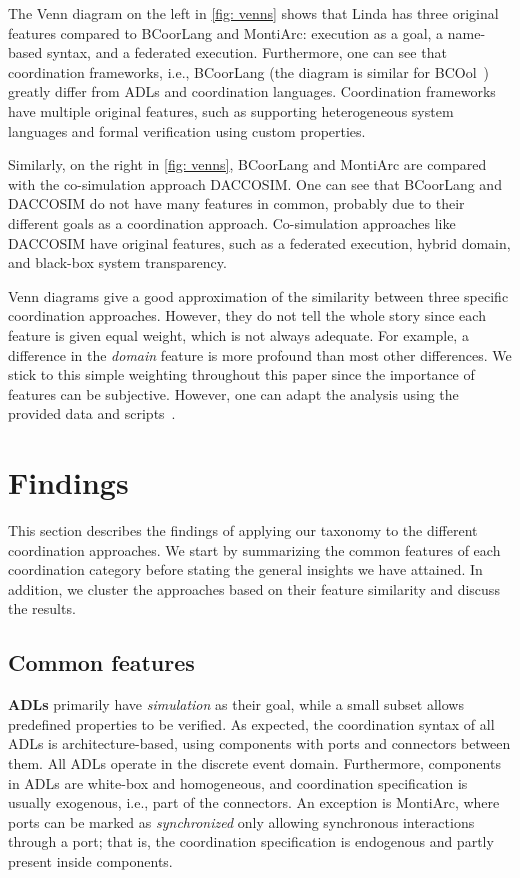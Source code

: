 \documentclass[runningheads]{llncs}
\begin{document}
The Venn diagram on the left in \autoref{fig: venns} shows that Linda has three original features compared to BCoorLang and MontiArc: execution as a goal, a name-based syntax, and a federated execution.
Furthermore, one can see that coordination frameworks, i.e., BCoorLang (the diagram is similar for BCOol~\cite{varalarsenBehavioralCoordinationOperator2015,varalarsenBCOolBehavioralCoordination2016}) greatly differ from ADLs and coordination languages.
Coordination frameworks have multiple original features, such as supporting heterogeneous system languages and formal verification using custom properties.

Similarly, on the right in \autoref{fig: venns}, BCoorLang and MontiArc are compared with the co-simulation approach DACCOSIM.
One can see that BCoorLang and DACCOSIM do not have many features in common, probably due to their different goals as a coordination approach.
Co-simulation approaches like DACCOSIM have original features, such as a federated execution, hybrid domain, and black-box system transparency.

Venn diagrams give a good approximation of the similarity between three specific coordination approaches.
However, they do not tell the whole story since each feature is given equal weight, which is not always adequate.
For example, a difference in the \textit{domain} feature is more profound than most other differences.
We stick to this simple weighting throughout this paper since the importance of features can be subjective.
However, one can adapt the analysis using the provided data and scripts~\cite{timkrauterArtifactsCoordination2024}.

\section{Findings} \label{sec: findings}

This section describes the findings of applying our taxonomy to the different coordination approaches.
We start by summarizing the common features of each coordination category before stating the general insights we have attained.
In addition, we cluster the approaches based on their feature similarity and discuss the results.

\subsection{Common features}

\textbf{ADLs} primarily have \textit{simulation} as their goal, while a small subset allows predefined properties to be verified.
As expected, the coordination syntax of all ADLs is architecture-based, using components with ports and connectors between them.
All ADLs operate in the discrete event domain.
Furthermore, components in ADLs are white-box and homogeneous, and coordination specification is usually exogenous, i.e., part of the connectors.
An exception is MontiArc, where ports can be marked as \textit{synchronized} only allowing synchronous interactions through a port; that is, the coordination specification is endogenous and partly present inside components.
\end{document}
